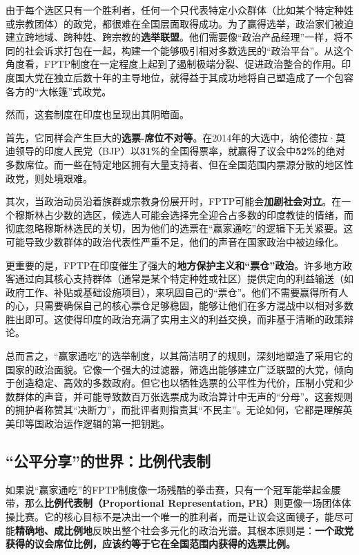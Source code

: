 由于每个选区只有一个胜利者，任何一个只代表特定小众群体（比如某个特定种姓或宗教团体）的政党，都很难在全国层面取得成功。为了赢得选举，政治家们被迫建立跨地域、跨种姓、跨宗教的\textbf{选举联盟}。他们需要像“政治产品经理”一样，将不同的社会诉求打包在一起，构建一个能够吸引相对多数选民的“政治平台”。从这个角度看，FPTP制度在一定程度上起到了遏制极端分裂、促进政治整合的作用。印度国大党在独立后数十年的主导地位，就得益于其成功地将自己塑造成了一个包容各方的“大帐篷”式政党。

然而，这套制度在印度也呈现出其阴暗面。

首先，它同样会产生巨大的\textbf{选票-席位不对等}。在2014年的大选中，纳伦德拉·莫迪领导的印度人民党（BJP）以\textbf{31\%}的全国得票率，就赢得了议会中\textbf{52\%}的绝对多数席位。而一些在特定地区拥有大量支持者、但在全国范围内票源分散的地区性政党，则处境艰难。

其次，当政治动员沿着族群或宗教身份展开时，FPTP可能会\textbf{加剧社会对立}。在一个穆斯林占少数的选区，候选人可能会选择完全迎合占多数的印度教徒的情绪，而彻底忽略穆斯林选民的关切，因为他们的选票在“赢家通吃”的逻辑下无关紧要。这可能导致少数群体的政治代表性严重不足，他们的声音在国家政治中被边缘化。

更重要的是，FPTP在印度催生了强大的\textbf{地方保护主义和“票仓”政治}。许多地方政客通过向其核心支持群体（通常是某个特定种姓或社区）提供定向的利益输送（如政府工作、补贴或基础设施项目），来巩固自己的“票仓”。他们不需要赢得所有人的心，只需要确保自己的核心票仓足够稳固，能够让他们在多方混战中以相对多数胜出即可。这使得印度的政治充满了实用主义的利益交换，而非基于清晰的政策辩论。

总而言之，“赢家通吃”的选举制度，以其简洁明了的规则，深刻地塑造了采用它的国家的政治面貌。它像一个强大的过滤器，筛选出能够建立广泛联盟的大党，倾向于创造稳定、高效的多数政府。但它也以牺牲选票的公平性为代价，压制小党和少数群体的声音，并可能导致数百万张选票成为政治算计中无声的“分母”。这套规则的拥护者称赞其“决断力”，而批评者则指责其“不民主”。无论如何，它都是理解英美印等国政治运作逻辑的第一把钥匙。

\subsection{“公平分享”的世界：比例代表制}

如果说“赢家通吃”的FPTP制度像一场残酷的拳击赛，只有一个冠军能举起金腰带，那么\textbf{比例代表制（Proportional Representation, PR）}则更像一场团体体操比赛。它的核心目标不是决出一个唯一的胜利者，而是让议会这面镜子，能尽可能\textbf{精确地、成比例地}反映出整个社会多元化的政治光谱。其根本原则是：\textbf{一个政党获得的议会席位比例，应该约等于它在全国范围内获得的选票比例。}


